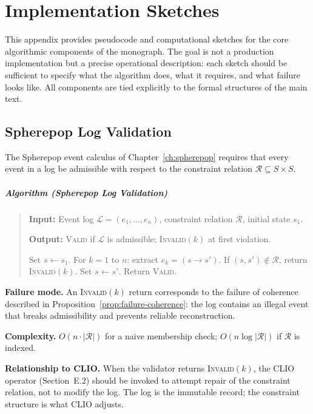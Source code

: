 \documentclass[11pt,openany]{book}
\begin{document}
\chapter{Implementation Sketches}
\label{app:implementation}

This appendix provides pseudocode and computational sketches
for the core algorithmic components of the monograph.  The
goal is not a production implementation but a precise
operational description: each sketch should be sufficient
to specify what the algorithm does, what it requires, and
what failure looks like.  All components are tied
explicitly to the formal structures of the main text.

\section{Spherepop Log Validation}
\label{sec:spherepop-impl}

The Spherepop event calculus of Chapter~\ref{ch:spherepop}
requires that every event in a log be admissible with
respect to the constraint relation $\mathcal{R} \subseteq
S \times S$.


\paragraph{Algorithm (Spherepop Log Validation)}\label{alg:spherepop}

\begin{quote}
\textbf{Input:} Event log $\mathcal{L} = (e_1, \ldots, e_n)$, constraint relation $\mathcal{R}$, initial state $s_1$.

\textbf{Output:} \textsc{Valid} if $\mathcal{L}$ is admissible; \textsc{Invalid}$(k)$ at first violation.

Set $s \gets s_1$. For $k = 1$ to $n$: extract $e_k = (s \to s')$. If $(s, s') \notin \mathcal{R}$, return \textsc{Invalid}$(k)$. Set $s \gets s'$. Return \textsc{Valid}.
\end{quote}


\textbf{Failure mode.} An \textsc{Invalid}$(k)$ return
corresponds to the failure of coherence described in
Proposition~\ref{prop:failure-coherence}: the log contains
an illegal event that breaks admissibility and prevents
reliable reconstruction.

\textbf{Complexity.} $O(n \cdot |\mathcal{R}|)$ for a
naive membership check; $O(n \log |\mathcal{R}|)$ if
$\mathcal{R}$ is indexed.

\textbf{Relationship to CLIO.} When the validator returns
\textsc{Invalid}$(k)$, the CLIO operator (Section~E.2)
should be invoked to attempt repair of the constraint
relation, not to modify the log.  The log is the immutable
record; the constraint structure is what CLIO adjusts.
\end{document}
